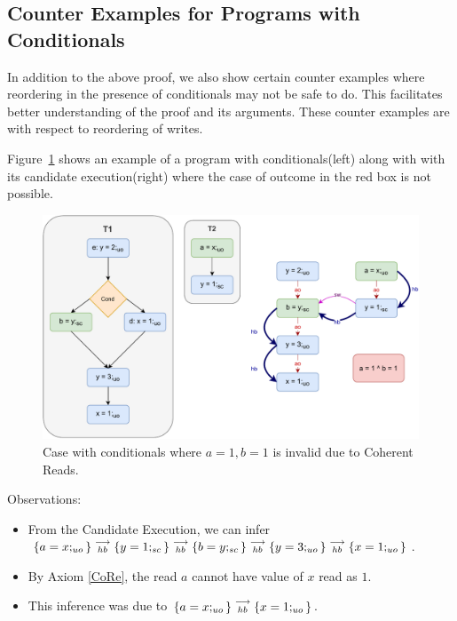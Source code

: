 \subsection{Counter Examples for Programs with Conditionals}
    
    In addition to the above proof, we also show certain counter examples where reordering in the presence of conditionals may not be safe to do. 
    This facilitates better understanding of the proof and its arguments. 
    These counter examples are with respect to reordering of writes. 
    
    Figure~\ref{reord:cond_counter_example1(a)} shows an example of a program with conditionals(left) along with with its candidate execution(right) where the case of outcome in the red box is not possible. 
    \begin{figure}[H]
        \centering 
        \includegraphics[scale=0.7]{5.InstructionReordering/5.ValidReorderingProgram/CounterExamples1a(Conditionals).pdf}
        \caption{Case with conditionals where $a = 1, b = 1$ is invalid due to Coherent Reads.}
        \label{reord:cond_counter_example1(a)}
    \end{figure}
    
    Observations:
    \begin{itemize}
        \item From the Candidate Execution, we can infer $\{a=x;_{uo}\}\stackrel{\longrightarrow}{_{hb}}\{y=1;_{sc}\}\stackrel{\longrightarrow}{_{hb}}\{b=y;_{sc}\}\stackrel{\longrightarrow}{_{hb}}\{y=3;_{uo}\}\stackrel{\longrightarrow}{_{hb}}\{x=1;_{uo}\}$.
        \item By Axiom \ref{CoRe}, the read $a$ cannot have value of $x$ read as $1$. 
        \item This inference was due to $\{a=x;_{uo}\}\stackrel{\longrightarrow}{_{hb}}\{x=1;_{uo}\}$.
    \end{itemize}
    
